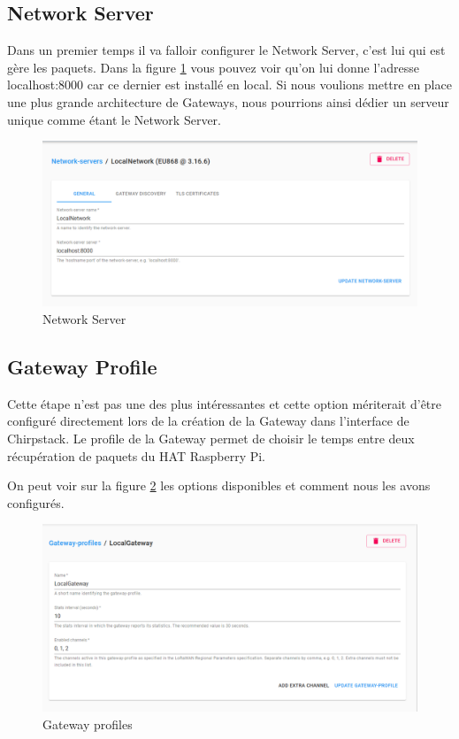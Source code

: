\documentclass{article}
\begin{document}
		\subsection{Network Server}
			Dans un premier temps il va falloir configurer le Network Server, c'est lui qui est gère les paquets. Dans la figure \ref{fig:networkserver} vous pouvez voir qu'on lui donne l'adresse localhost:8000 car ce dernier est installé en local. Si nous voulions mettre en place une plus grande architecture de Gateways, nous pourrions ainsi dédier un serveur unique comme étant le Network Server.
			\begin{figure}[H]
				\centering
				\includegraphics[width=0.7\linewidth]{networkserver}
				\caption{Network Server}
				\label{fig:networkserver}
			\end{figure}
		
		\subsection{Gateway Profile}
			Cette étape n'est pas une des plus intéressantes et cette option mériterait d'être configuré directement lors de la création de la Gateway dans l'interface de Chirpstack. Le profile de la Gateway permet de choisir le temps entre deux récupération de paquets du HAT Raspberry Pi.
			
			On peut voir sur la figure \ref{fig:gateway-profile} les options disponibles et comment nous les avons configurés. 
			
			\begin{figure}[H]
				\centering
				\includegraphics[width=0.7\linewidth]{gateway-profile}
				\caption{Gateway profiles}
				\label{fig:gateway-profile}
			\end{figure}
		
\end{document}
